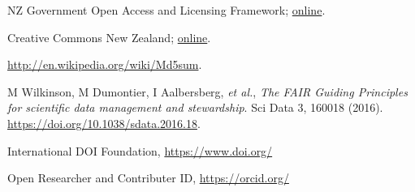 \begin{thebibliography}{9}
 NZ Government Open Access and Licensing Framework; \href{https://www.ict.govt.nz/guidance-and-resources/open-government/new-zealand-government-open-access-and-licensing-nzgoal-framework}{online}.

 Creative Commons New Zealand; \href{https://www.tohatoha.org.nz/creative-commons/}{online}. 

 \url{http://en.wikipedia.org/wiki/Md5sum}. 

M Wilkinson, M Dumontier, I Aalbersberg, \textit{et al.}, \textit{The FAIR Guiding Principles for scientific data management and stewardship}. Sci Data 3, 160018 (2016). \url{https://doi.org/10.1038/sdata.2016.18}.

 International DOI Foundation, \url{https://www.doi.org/}

 Open Researcher and Contributer ID, \url{https://orcid.org/}

\end{thebibliography}
\endgroup
